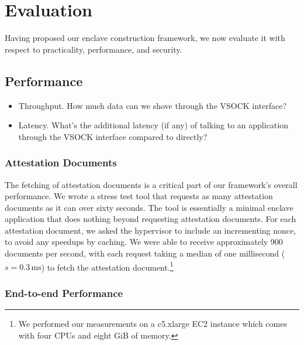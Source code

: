 \section{Evaluation}
\label{sec:evaluation}

Having proposed our enclave construction framework, we now evaluate it with respect to practicality, performance, and security.

\subsection{Performance}
\label{sec:performance}

\begin{itemize}
    \item Throughput. How much data can we shove through the VSOCK interface?
    \item Latency. What's the additional latency (if any) of talking to an application through the VSOCK interface compared to directly?
\end{itemize}

\subsubsection{Attestation Documents}
\label{sec:attestation-performance}

The fetching of attestation documents is a critical part of our framework's overall performance.  We wrote a stress test tool that requests as many attestation documents as it can over sixty seconds.  The tool is essentially a minimal enclave application that does nothing beyond requesting attestation documents.  For each attestation document, we asked the hypervisor to include an incrementing nonce, to avoid any speedups by caching.  We were able to receive approximately 900 documents per second, with each request taking a median of one millisecond ($s = 0.3\,\text{ms}$) to fetch the attestation document.\footnote{We performed our measurements on a c5.xlarge EC2 instance which comes with four CPUs and eight GiB of memory.}

\subsubsection{End-to-end Performance}
\label{sec:end-to-end}

